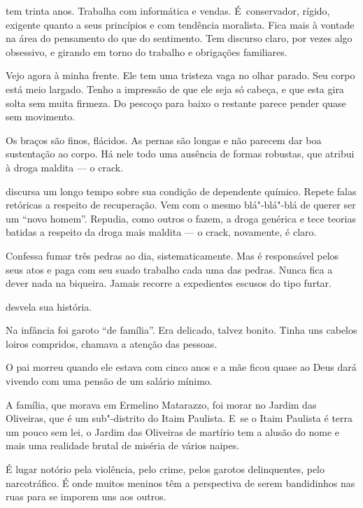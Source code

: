  

 tem trinta anos. Trabalha com informática e vendas. É~conservador,
rígido, exigente quanto a seus princípios e com tendência moralista.
Fica mais à vontade na área do pensamento do que do sentimento. Tem
discurso claro, por vezes algo obsessivo, e girando em torno do trabalho
e obrigações familiares.

Vejo agora  à minha frente. Ele tem uma tristeza vaga no olhar parado.
Seu corpo está meio largado. Tenho a impressão de que ele seja só
cabeça, e que esta gira solta sem muita firmeza. Do pescoço para baixo o
restante parece pender quase sem movimento.

Os braços são finos, flácidos. As pernas são longas e não parecem dar
boa sustentação ao corpo. Há nele todo uma ausência de formas robustas,
que  atribui à droga maldita --- o crack.

\asterisc{}

 discursa um longo tempo sobre sua condição de dependente químico.
Repete falas retóricas a respeito de recuperação. Vem com o mesmo
blá"-blá"-blá de querer ser um ``novo homem''. Repudia, como outros o
fazem, a droga genérica e tece teorias batidas a respeito da droga mais
maldita --- o crack, novamente, é claro.

Confessa fumar três pedras ao dia, sistematicamente. Mas é responsável
pelos seus atos e paga com seu suado trabalho cada uma das pedras. Nunca
fica a dever nada na biqueira. Jamais recorre a expedientes escusos do
tipo furtar.

\asterisc{}

 desvela sua história.

Na infância foi garoto ``de família''. Era delicado, talvez bonito.
Tinha uns cabelos loiros compridos, chamava a atenção das pessoas.

O pai morreu quando ele estava com cinco anos e a mãe ficou quase ao
Deus dará vivendo com uma pensão de um salário mínimo.

A família, que morava em Ermelino Matarazzo, foi morar no Jardim das
Oliveiras, que é um sub"-distrito do Itaim Paulista. E~se o Itaim
Paulista é terra um pouco sem lei, o Jardim das Oliveiras de martírio
tem a alusão do nome e mais uma realidade brutal de miséria de vários
naipes.

É lugar notório pela violência, pelo crime, pelos garotos delinquentes,
pelo narcotráfico. É onde muitos meninos têm a perspectiva de serem
bandidinhos nas ruas para se imporem uns aos outros.


